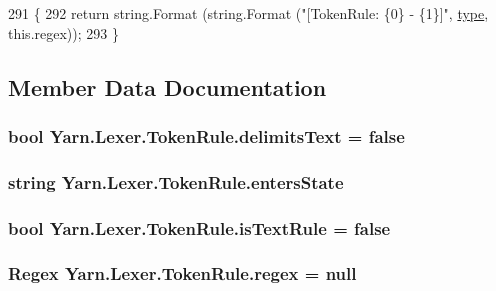 \begin{DoxyCode}
291             \{
292                 \textcolor{keywordflow}{return} string.Format (string.Format (\textcolor{stringliteral}{"[TokenRule: \{0\} - \{1\}]"}, 
      \hyperlink{a00096_a0de6fac3b55cf0c61e07cea53ce67caa}{type}, this.regex));
293             \}
\end{DoxyCode}


\subsection{Member Data Documentation}
\hypertarget{a00096_ab0849136a1f27b4d13cb7a45e2fe7130}{
\subsubsection[{delimits\-Text}]{\setlength{\rightskip}{0pt plus 5cm}bool Yarn.\-Lexer.\-Token\-Rule.\-delimits\-Text = false}}\label{a00096_ab0849136a1f27b4d13cb7a45e2fe7130}
\hypertarget{a00096_af6a4bd3416c4e1b8e56f9db461d52d18}{
\subsubsection[{enters\-State}]{\setlength{\rightskip}{0pt plus 5cm}string Yarn.\-Lexer.\-Token\-Rule.\-enters\-State}}\label{a00096_af6a4bd3416c4e1b8e56f9db461d52d18}
\hypertarget{a00096_a09f49e6edf9ace38a92d723998181f8f}{
\subsubsection[{is\-Text\-Rule}]{\setlength{\rightskip}{0pt plus 5cm}bool Yarn.\-Lexer.\-Token\-Rule.\-is\-Text\-Rule = false}}\label{a00096_a09f49e6edf9ace38a92d723998181f8f}
\hypertarget{a00096_a47a404d6637fae489c3c77729a01cc69}{
\subsubsection[{regex}]{\setlength{\rightskip}{0pt plus 5cm}Regex Yarn.\-Lexer.\-Token\-Rule.\-regex = null}}\label{a00096_a47a404d6637fae489c3c77729a01cc69}

